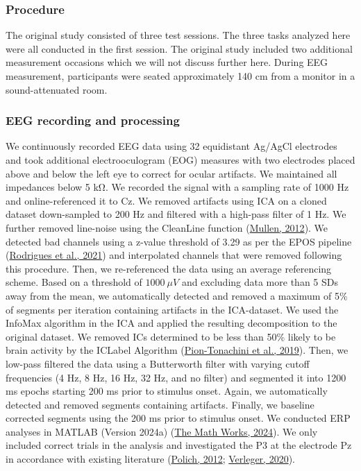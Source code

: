 \documentclass[
  man]{apa7}
\begin{document}
\hypertarget{procedure}{%
\subsubsection{Procedure}\label{procedure}}

The original study consisted of three test sessions. The three tasks analyzed here were all conducted in the first session. The original study included two additional measurement occasions which we will not discuss further here. During EEG measurement, participants were seated approximately 140 cm from a monitor in a sound-attenuated room.

\hypertarget{eeg-recording-and-processing}{%
\subsubsection{EEG recording and processing}\label{eeg-recording-and-processing}}

We continuously recorded EEG data using 32 equidistant Ag/AgCl electrodes and took additional electrooculogram (EOG) measures with two electrodes placed above and below the left eye to correct for ocular artifacts. We maintained all impedances below 5 kΩ. We recorded the signal with a sampling rate of 1000 Hz and online-referenced it to Cz. We removed artifacts using ICA on a cloned dataset down-sampled to 200 Hz and filtered with a high-pass filter of 1 Hz. We further removed line-noise using the CleanLine function (\protect\hyperlink{ref-mullen2012cleanline}{Mullen, 2012}). We detected bad channels using a z-value threshold of 3.29 as per the EPOS pipeline (\protect\hyperlink{ref-rodrigues2021epos}{Rodrigues et al., 2021}) and interpolated channels that were removed following this procedure. Then, we re-referenced the data using an average referencing scheme. Based on a threshold of \(1000 \ \mu V\) and excluding data more than 5 SDs away from the mean, we automatically detected and removed a maximum of 5\% of segments per iteration containing artifacts in the ICA-dataset. We used the InfoMax algorithm in the ICA and applied the resulting decomposition to the original dataset. We removed ICs determined to be less than 50\% likely to be brain activity by the ICLabel Algorithm (\protect\hyperlink{ref-pion2019iclabel}{Pion-Tonachini et al., 2019}). Then, we low-pass filtered the data using a Butterworth filter with varying cutoff frequencies (4 Hz, 8 Hz, 16 Hz, 32 Hz, and no filter) and segmented it into 1200 ms epochs starting 200 ms prior to stimulus onset. Again, we automatically detected and removed segments containing artifacts. Finally, we baseline corrected segments using the 200 ms prior to stimulus onset. We conducted ERP analyses in MATLAB (Version 2024a) (\protect\hyperlink{ref-matlab2024a}{The Math Works, 2024}). We only included correct trials in the analysis and investigated the P3 at the electrode Pz in accordance with existing literature (\protect\hyperlink{ref-polich2012neuropsychology}{Polich, 2012}; \protect\hyperlink{ref-verleger2020effects}{Verleger, 2020}).
\end{document}
